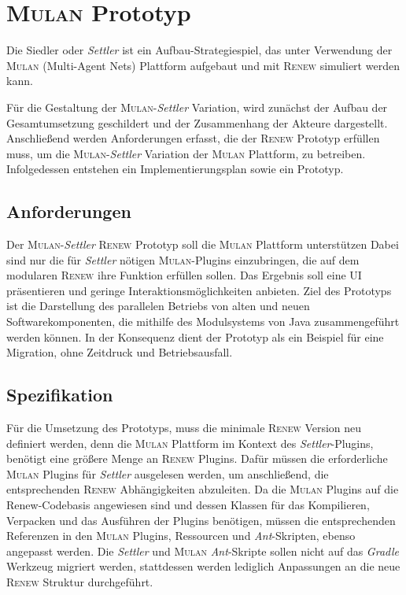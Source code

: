 \chapter{\textsc{Mulan} Prototyp} \label{cha:mulan_settler}
	Die Siedler oder \textit{Settler} ist ein Aufbau-Strategiespiel, das unter Verwendung der \textsc{Mulan} (Multi-Agent Nets) Plattform aufgebaut und mit \textsc{Renew} simuliert werden kann. \bigbreak
	
	Für die Gestaltung der \textsc{Mulan}-\textit{Settler} Variation, wird zunächst der Aufbau der Gesamtumsetzung geschildert und der Zusammenhang der Akteure dargestellt. Anschließend werden Anforderungen erfasst, die der \textsc{Renew} Prototyp erfüllen muss, um die \textsc{Mulan}-\textit{Settler} Variation der \textsc{Mulan} Plattform, zu betreiben. Infolgedessen entstehen ein Implementierungsplan sowie ein Prototyp.

\section{Anforderungen} \label{sec:anforderungen2}
	Der \textsc{Mulan}-\textit{Settler} \textsc{Renew} Prototyp soll die \textsc{Mulan} Plattform unterstützen Dabei sind nur die für \textit{Settler} nötigen \textsc{Mulan}-Plugins einzubringen, die auf dem modularen \textsc{Renew} ihre Funktion erfüllen sollen. Das Ergebnis soll eine UI präsentieren und geringe Interaktionsmöglichkeiten anbieten.\newline 
	Ziel des Prototyps ist die Darstellung des parallelen Betriebs von alten und neuen Softwarekomponenten, die mithilfe des Modulsystems von Java zusammengeführt werden können. In der Konsequenz dient der Prototyp als ein Beispiel für eine Migration, ohne Zeitdruck und Betriebsausfall.

\section{Spezifikation}
	Für die Umsetzung des Prototyps, muss die minimale \textsc{Renew} Version neu definiert werden, denn die \textsc{Mulan} Plattform im Kontext des \textit{Settler}-Plugins, benötigt eine größere Menge an \textsc{Renew} Plugins. Dafür müssen die erforderliche \textsc{Mulan} Plugins für \textit{Settler} ausgelesen werden, um anschließend, die entsprechenden \textsc{Renew} Abhängigkeiten abzuleiten. \newline
	Da die \textsc{Mulan} Plugins auf die Renew-Codebasis angewiesen sind und dessen Klassen für das Kompilieren, Verpacken und das Ausführen der Plugins benötigen, müssen die entsprechenden Referenzen in den \textsc{Mulan} Plugins, Ressourcen und \textit{Ant}-Skripten, ebenso angepasst werden. \newline
	Die \textit{Settler} und \textsc{Mulan} \textit{Ant}-Skripte sollen nicht auf das \textit{Gradle} Werkzeug migriert werden, stattdessen werden lediglich Anpassungen an die neue \textsc{Renew} Struktur durchgeführt.\bigbreak
	
